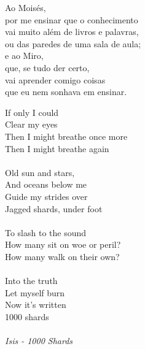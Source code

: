 \documentclass[12pt,twoside]{report}
\begin{document}
\newpage

\vspace*{0.7\textheight}
\begin{flushright}

    Ao Moisés, \\ 
    por me ensinar que o conhecimento \\ 
    vai muito além de livros e palavras, \\
    ou das paredes de uma sala de aula; \\
    \vspace{0.5 cm}
    e ao Miro, \\
    que, se tudo der certo, \\ 
    vai aprender comigo coisas \\
    que eu nem sonhava em ensinar.

\end{flushright}

\newpage

\vspace*{0.2\textheight}
{\noindent 
If only I could \\
Clear my eyes \\
Then I might breathe once more \\
Then I might breathe again \\
\vspace{0.2 cm} \\
Old sun and stars, \\
And oceans below me \\
Guide my strides over \\
Jagged shards, under foot \\
\vspace{0.2 cm} \\
To slash to the sound \\
How many sit on woe or peril? \\
How many walk on their own? \\
\vspace{0.2 cm} \\
Into the truth \\
Let myself burn \\
Now it's written \\
1000 shards \\
\vspace{0.2 cm} \\
\emph {Isis - 1000 Shards}
}
\end{document}
